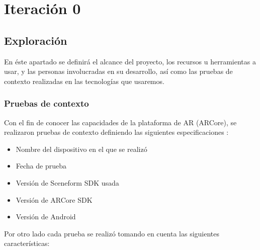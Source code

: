 \section{Iteración 0}
\subsection{Exploración}
En éste apartado se definirá el alcance del proyecto, los recursos u herramientas a usar, y las personas involucradas en su desarrollo, así como las pruebas de contexto realizadas en las tecnologías que usaremos.


\subsubsection{Pruebas de contexto}
Con el fin de conocer las capacidades de la plataforma de AR (ARCore), se realizaron pruebas de contexto definiendo las siguientes especificaciones 	:
\begin{itemize}
	\item Nombre del dispositivo en el que se realizó
	\item Fecha de prueba
	\item Versión de Sceneform SDK usada
	\item Versión de ARCore SDK
	\item Versión de Android
\end{itemize}
Por otro lado cada prueba se realizó tomando en cuenta las siguientes características:
